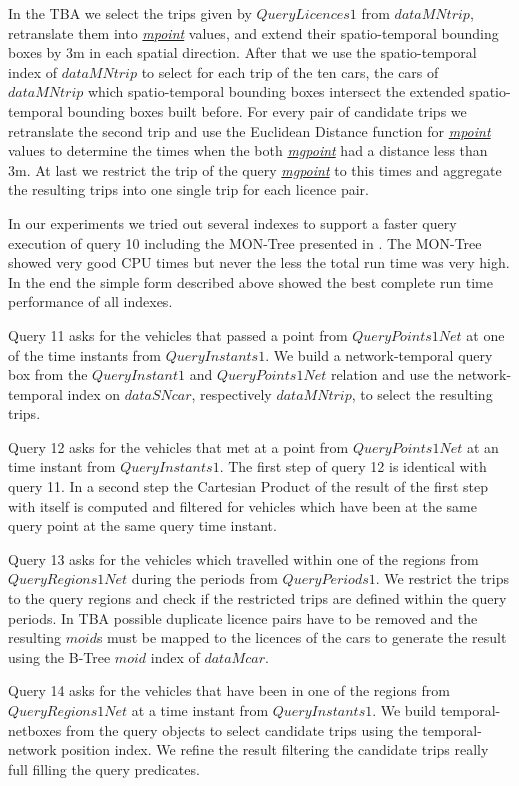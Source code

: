 \documentclass[a4paper]{article}
\newcommand{\dt}[1]{\textsl{\underline{#1}}}
\begin{document}
In the TBA we select the trips given by $QueryLicences1$ from
$dataMNtrip$, retranslate them into \dt{mpoint} values, and extend their spatio-temporal
bounding boxes by 3m in each spatial direction. After that we use the spatio-temporal
index of $dataMNtrip$ to select for each trip of the ten cars, the cars
of $dataMNtrip$ which spatio-temporal bounding boxes intersect the extended spatio-temporal
bounding boxes built before. For every pair of candidate trips we
retranslate the second trip and use the Euclidean Distance function for \dt{mpoint}
values to determine the times when the both \dt{mgpoint} had a distance less than 3m.
At last we restrict the trip of the query \dt{mgpoint} to this times and
aggregate the resulting trips into one single trip for each licence pair.

In our experiments we tried out several indexes to support a faster query execution
of query 10 including the MON-Tree presented in \cite{MONTreeAlmeidaGeoinformatica}. The MON-Tree showed
very good CPU times but never the less the total run time was very high. In the end
the simple form described above showed the best complete run time performance of all
indexes.

Query 11 asks for the vehicles that passed a point from $QueryPoints1Net$ at one of the
time instants from $QueryInstants1$. We build a network-temporal query box from the
$QueryInstant1$ and $QueryPoints1Net$ relation and use the network-temporal index
on $dataSNcar$, respectively $dataMNtrip$, to select the resulting trips.

Query 12 asks for the vehicles that met at a point from $QueryPoints1Net$ at an time
instant from $QueryInstants1$. The first step of query 12 is identical with query 11.
In a second step the Cartesian Product of the result of the first step with itself
is computed and filtered for vehicles which have been at the same query point
at the same query time instant.

Query 13 asks for the vehicles which travelled within one of the regions from
$QueryRegions1Net$ during the periods from $QueryPeriods1$. We restrict the trips
to the query regions and check if the restricted trips are defined within the query
periods. In TBA possible duplicate licence pairs have to be removed and the
resulting $moid$s must be mapped to the licences of the cars to generate the result
using the B-Tree $moid$ index of $dataMcar$.

Query 14 asks for the vehicles that have been in one of the regions from $QueryRegions1Net$
at a time instant from $QueryInstants1$. We build temporal-netboxes from the query
objects to select candidate trips using the temporal-network position index. We refine the
result filtering the candidate trips really full filling the query predicates.
\end{document}

